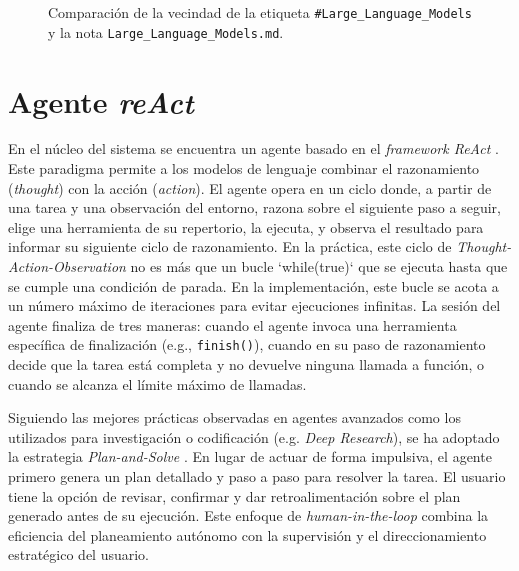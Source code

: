 \begin{figure}[h!]
\begin{subfigure}[b]{0.48\textwidth}
        \label{fig:llm_note}
    \end{subfigure}
    \caption{Comparación de la vecindad de la etiqueta \texttt{\#Large\_Language\_Models} y la nota \texttt{Large\_Language\_Models.md}.}
    \label{fig:obsidian_force_graph_example}
\end{figure}

\section{Agente \textit{reAct}}
En el núcleo del sistema se encuentra un agente basado en el \textit{framework ReAct} \parencite{yaoReActSynergizingReasoning2023}. Este paradigma permite a los modelos de lenguaje combinar el razonamiento (\textit{thought}) con la acción (\textit{action}). El agente opera en un ciclo donde, a partir de una tarea y una observación del entorno, razona sobre el siguiente paso a seguir, elige una herramienta de su repertorio, la ejecuta, y observa el resultado para informar su siguiente ciclo de razonamiento. En la práctica, este ciclo de \textit{Thought-Action-Observation} no es más que un bucle `while(true)` que se ejecuta hasta que se cumple una condición de parada. En la implementación, este bucle se acota a un número máximo de iteraciones para evitar ejecuciones infinitas. La sesión del agente finaliza de tres maneras: cuando el agente invoca una herramienta específica de finalización (e.g., \texttt{finish()}), cuando en su paso de razonamiento decide que la tarea está completa y no devuelve ninguna llamada a función, o cuando se alcanza el límite máximo de llamadas.

Siguiendo las mejores prácticas observadas en agentes avanzados como los utilizados para investigación o codificación (e.g. \textit{Deep Research}), se ha adoptado la estrategia \textit{Plan-and-Solve} \parencite{wangPlanandSolvePromptingImproving2023}. En lugar de actuar de forma impulsiva, el agente primero genera un plan detallado y paso a paso para resolver la tarea. El usuario tiene la opción de revisar, confirmar y dar retroalimentación sobre el plan generado antes de su ejecución. Este enfoque de \textit{human-in-the-loop} combina la eficiencia del planeamiento autónomo con la supervisión y el direccionamiento estratégico del usuario.

